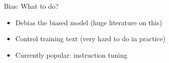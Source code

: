 
\begin{vbframe}{Bias: What to do?}

\vfill

  \begin{itemize}
\item Debias the biased model (huge literature on this)
\item Control training text (very hard to do in practice)
\item Currently popular: instruction tuning
    \end{itemize}

\vfill

\end{vbframe}

\endlecture

